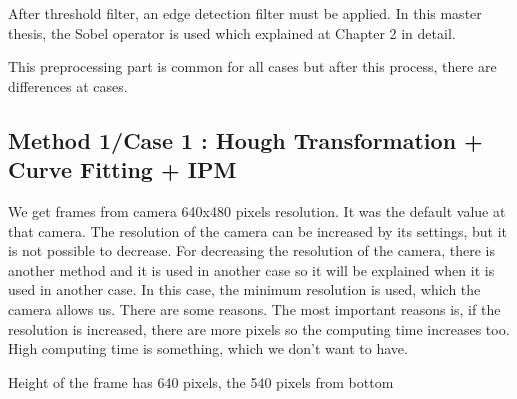 After threshold filter, an edge detection filter must be applied. In this master thesis, the Sobel operator is used which explained at Chapter 2 in detail.
 
 This preprocessing part is common for all cases but after this process, there are differences at cases.
 
%
\subsection{Method 1/Case 1 : Hough Transformation + Curve Fitting + IPM}\label{sec:Method 1}

We get frames from camera 640x480 pixels resolution. It was the default value at that camera. The resolution of the camera can be increased by its settings, but it is not possible to decrease. For decreasing the resolution of the camera, there is another method and it is used in another case so it will be explained when it is used in another case. In this case, the minimum resolution is used, which the camera allows us. There are some reasons. The most important reasons is, if the resolution is increased, there are more pixels so the computing time increases too. High computing time is something, which we don't want to have.

Height of the frame has 640 pixels, the 540 pixels from bottom 

 




 
%


